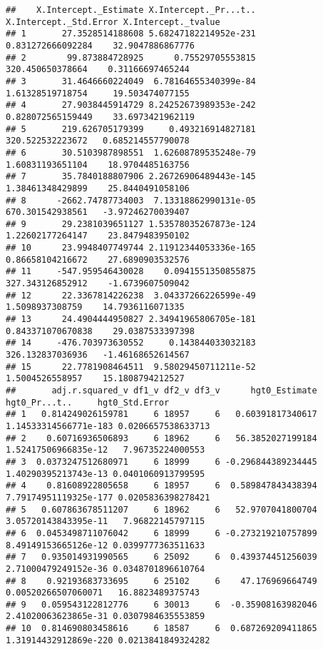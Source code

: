 \documentclass[
]{book}
\begin{document}
\begin{verbatim}
##    X.Intercept._Estimate X.Intercept._Pr...t.. X.Intercept._Std.Error X.Intercept._tvalue
## 1       27.3528514188608 5.68247182214952e-231      0.831272666092284    32.9047886867776
## 2        99.873884728925      0.75529705553815       320.450650378664    0.31166697465244
## 3       31.4646660224049  6.78164655340399e-84       1.61328519718754     19.503474077155
## 4       27.9038445914729 8.24252673989353e-242      0.828072565159449    33.6973421962119
## 5       219.626705179399     0.493216914827181       320.522532223672   0.685214557790078
## 6       30.5103987898551  1.62608789535248e-79       1.60831193651104    18.9704485163756
## 7       35.7840188807906 2.26726906489443e-145       1.38461348429899    25.8440491058106
## 8      -2662.74787734003  7.13318862990131e-05       670.301542938561   -3.97246270039407
## 9       29.2381039651127 1.53578035267873e-124       1.22602177264147    23.8479483950102
## 10      23.9948407749744 2.11912344053336e-165       0.86658104216672    27.6890903532576
## 11     -547.959546430028    0.0941551350855875       327.343126852912    -1.6739607509042
## 12      22.3367814226238  3.04337266226599e-49        1.5098937308759    14.7936116071335
## 13      24.4904444950827 2.34941965806705e-181      0.843371070670838    29.0387533397398
## 14     -476.703973630552     0.143844033032183       326.132837036936   -1.46168652614567
## 15      22.7781908464511  9.58029450711211e-52        1.5004526558957    15.1808794212527
##       adj.r.squared_v df1_v df2_v df3_v      hgt0_Estimate         hgt0_Pr...t..     hgt0_Std.Error
## 1   0.814249026159781     6 18957     6   0.60391817340617 1.14533314566771e-183 0.0206657538633713
## 2    0.60716936506893     6 18962     6   56.3852027199184  1.52417506966835e-12   7.96735224000553
## 3  0.0373247512680971     6 18999     6 -0.296844389234445  1.40290395213743e-13 0.0401060913799595
## 4    0.81608922805658     6 18957     6  0.589847843438394 7.79174951119325e-177 0.0205836398278421
## 5   0.607863678511207     6 18962     6   52.9707041800704  3.05720143843395e-11   7.96822145797115
## 6  0.0453498711076042     6 18999     6 -0.273219210757899  8.49149153665126e-12 0.0399777363511633
## 7   0.935014931990565     6 25092     6  0.439374451256039  2.71000479249152e-36 0.0348701896610764
## 8    0.92193683733695     6 25102     6    47.176969664749   0.00520266507060071   16.8823489375743
## 9   0.059543122812776     6 30013     6  -0.35908163982046  2.41020063623865e-31 0.0307984635553859
## 10  0.814690803458616     6 18587     6  0.687269209411865 1.31914432912869e-220 0.0213841849324282

\end{verbatim}
\end{document}
